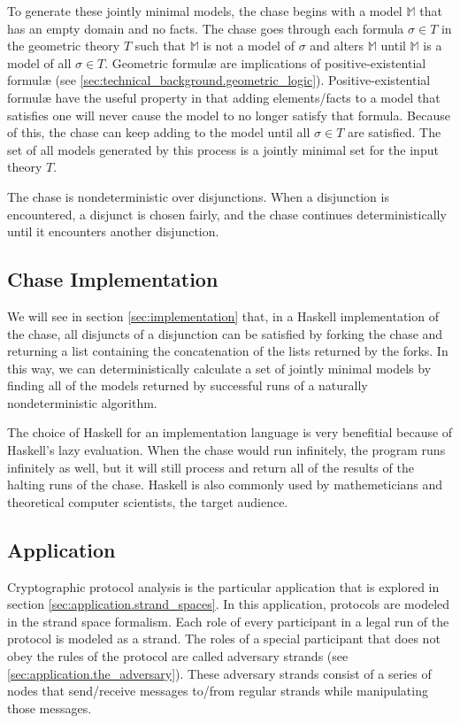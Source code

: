 		To generate these jointly minimal models, the chase begins with a model
		$\mathbb{M}$ that has an empty domain and no facts. The chase goes
		through each formula $\sigma \in T$ in the geometric theory $T$ such that
		$\mathbb{M}$ is not a model of $\sigma$ and alters $\mathbb{M}$ until
		$\mathbb{M}$ is a model of all $\sigma \in T$. Geometric formul{\ae}
		are implications of positive-existential formul{\ae} (see
		\ref{sec:technical_background.geometric_logic}). Positive-existential
		formul{\ae} have the useful property in that adding elements/facts to a
		model that satisfies one will never cause the model to no longer
		satisfy that formula. Because of this, the chase can keep adding to the
		model until all $\sigma \in T$ are satisfied. The set of all models
		generated by this process is a jointly minimal set for the input theory
		$T$.

		The chase is nondeterministic over disjunctions. When a disjunction is
		encountered, a disjunct is chosen fairly, and the chase continues
		deterministically until it encounters another disjunction.

	\subsection{Chase Implementation}

		We will see in section \ref{sec:implementation} that, in a Haskell
		implementation of the chase, all disjuncts of a disjunction can be
		satisfied by forking the chase and returning a list containing the
		concatenation of the lists returned by the forks. In this way, we can
		deterministically calculate a set of jointly minimal models by finding
		all of the models returned by successful runs of a naturally
		nondeterministic algorithm.

		The choice of Haskell for an implementation language is very benefitial
		because of Haskell's lazy evaluation. When the chase would run
		infinitely, the program runs infinitely as well, but it will still
		process and return all of the results of the halting runs of the chase.
		Haskell is also commonly used by mathemeticians and theoretical
		computer scientists, the target audience.

	\subsection{Application}

		Cryptographic protocol analysis is the particular application that is
		explored in section \ref{sec:application.strand_spaces}. In this
		application, protocols are modeled in the strand space formalism. Each
		role of every participant in a legal run of the protocol is modeled as
		a strand. The roles of a special participant that does not obey the
		rules of the protocol are called adversary strands (see
		\ref{sec:application.the_adversary}). These adversary strands consist
		of a series of nodes that send/receive messages to/from regular strands
		while manipulating those messages.

